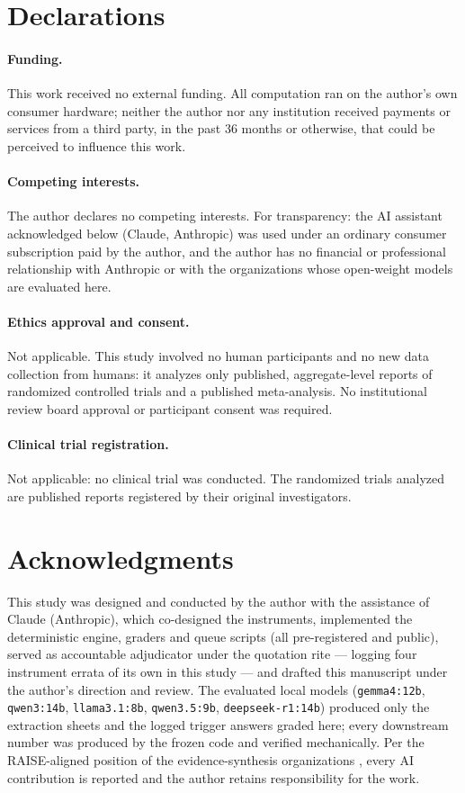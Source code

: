 \documentclass[11pt]{article}
\begin{document}
\section*{Declarations}

\paragraph{Funding.} This work received no external funding. All computation ran on the author's own consumer hardware; neither the author nor any institution received payments or services from a third party, in the past 36 months or otherwise, that could be perceived to influence this work.

\paragraph{Competing interests.} The author declares no competing interests. For transparency: the AI assistant acknowledged below (Claude, Anthropic) was used under an ordinary consumer subscription paid by the author, and the author has no financial or professional relationship with Anthropic or with the organizations whose open-weight models are evaluated here.

\paragraph{Ethics approval and consent.} Not applicable. This study involved no human participants and no new data collection from humans: it analyzes only published, aggregate-level reports of randomized controlled trials and a published meta-analysis. No institutional review board approval or participant consent was required.

\paragraph{Clinical trial registration.} Not applicable: no clinical trial was conducted. The randomized trials analyzed are published reports registered by their original investigators.

\section*{Acknowledgments}

This study was designed and conducted by the author with the assistance of Claude (Anthropic), which co-designed the instruments, implemented the deterministic engine, graders and queue scripts (all pre-registered and public), served as accountable adjudicator under the quotation rite --- logging four instrument errata of its own in this study --- and drafted this manuscript under the author's direction and review. The evaluated local models (\texttt{gemma4:12b}, \texttt{qwen3:14b}, \texttt{llama3.1:8b}, \texttt{qwen3.5:9b}, \texttt{deepseek-r1:14b}) produced only the extraction sheets and the logged trigger answers graded here; every downstream number was produced by the frozen code and verified mechanically. Per the RAISE-aligned position of the evidence-synthesis organizations \citep{flemyng2025position}, every AI contribution is reported and the author retains responsibility for the work.


\end{document}
